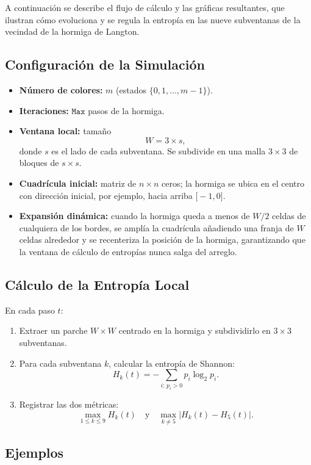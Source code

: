 \documentclass[twocolumn]{article}
\begin{document}
A continuación se describe el flujo de cálculo y las gráficas resultantes, que ilustran cómo evoluciona y se regula la entropía en las nueve subventanas de la vecindad de la hormiga de Langton.

\subsection{Configuración de la Simulación}

\begin{itemize}
  \item \textbf{Número de colores:} \(m\) (estados \(\{0,1,\dots,m-1\}\)).  
  \item \textbf{Iteraciones:} \(\texttt{Max}\) pasos de la hormiga.  
  \item \textbf{Ventana local:} tamaño 
    \[
      W = 3 \times s,
    \]
    donde \(s\) es el lado de cada subventana. Se subdivide en una malla \(3\times3\) de bloques de \(s\times s\).  
  \item \textbf{Cuadrícula inicial:} matriz de \(n\times n\) ceros; la hormiga se ubica en el centro con dirección inicial, por ejemplo, hacia arriba \(\bigl[-1,0\bigr]\).  
  \item \textbf{Expansión dinámica:} cuando la hormiga queda a menos de \(W/2\) celdas de cualquiera de los bordes, se amplía la cuadrícula añadiendo una franja de \(W\) celdas alrededor y se recenteriza la posición de la hormiga, garantizando que la ventana de cálculo de entropías nunca salga del arreglo.
\end{itemize}
\subsection{Cálculo de la Entropía Local}
En cada paso \(t\):
\begin{enumerate}
  \item Extraer un parche \(W\times W\) centrado en la hormiga y subdividirlo en \(3\times3\) subventanas.
  \item Para cada subventana \(k\), calcular la entropía de Shannon:
    \[
      H_k(t) = -\sum_{i:\,p_i>0} p_i \log_2 p_i.
    \]
  \item Registrar las dos métricas:
    \[
      \max_{1\le k\le9}H_k(t)
      \quad\text{y}\quad
      \max_{k\neq5}\bigl|H_k(t) - H_5(t)\bigr|.
    \]
\end{enumerate}
\subsection{Ejemplos}
\end{document}
